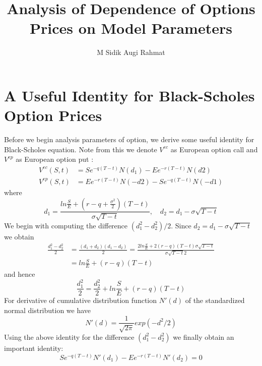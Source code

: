 \documentclass[a4paper]{article}
\title{Analysis of Dependence of Options Prices on Model Parameters}
\date{}
\author{M Sidik Augi Rahmat}
\begin{document}
\maketitle
\section{A Useful Identity for Black-Scholes Option Prices}
Before we begin analysis parameters of option, we derive some useful identity for Black-Scholes equation. Note from this we denote $V^{ec}$ as European option call and 
$V^{ep}$ as European option put :
\begin{align}
    V^{ec}(S, t) &= Se^{-q(T-t)}N(d_1)-Ee^{-r(T-t)}N(d2)\\
    V^{ep}(S, t) &= Ee^{-r(T-t)}N(-d2)-Se^{-q(T-t)}N(-d1)
\end{align}
where 
\begin{equation}
    d_1 = \frac{ln\frac{S}{E} + (r - q + \frac{\sigma^2}{2})(T-t)}{\sigma \sqrt{T-t}}, \quad d_2 = d_1 - \sigma\sqrt{T-t}
\end{equation}
We begin with computing the difference $(d_1^2 - d_2^2)/2$. Since $d_2 = d_1 - \sigma\sqrt{T-t}$ we obtain
\begin{align}
    \frac{d^2_1 -d^2_2}{2} &= \frac{(d_1 + d_2)(d_1 - d_2)}{2} = \frac{2 ln \frac{S}{E} + 2(r-q)(T-t) \sigma\sqrt{T-t}}{\sigma \sqrt{T-t} 2}\\
    &= ln \frac{S}{E} + (r-q)(T-t)
\end{align}
and hence
\begin{equation}
    \frac{d_1 ^ 2}{2} = \frac{d_2^2}{2} + ln \frac{S}{E} + (r-q)(T-t)
\end{equation}
For derivative of cumulative distribution function $N'(d)$ of the standardized normal distribution we have
\begin{equation}
    N'(d) = \frac{1}{\sqrt{2\pi}}exp(-d^2 / 2)
\end{equation}
Using the above identity for the difference $(d_1^2 -d_2^2)$ we finally obtain an important identity:
\begin{equation}
    Se^{-q(T-t)}N'(d_1)-Ee^{-r(T-t)}N'(d_2) = 0
    \label{eq:identity}
\end{equation}
\end{document}
